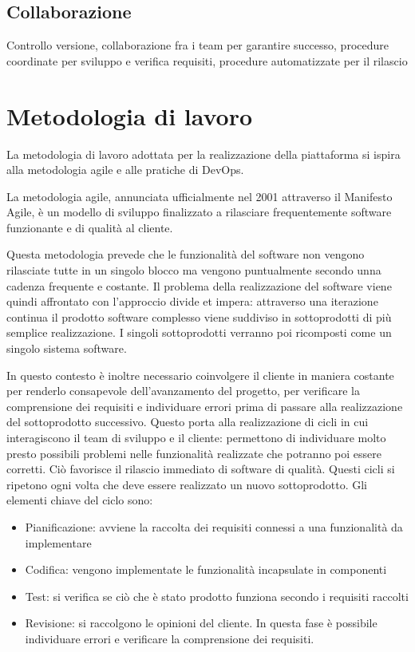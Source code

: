 \subsection{Collaborazione}
Controllo versione, collaborazione fra i team per garantire successo, procedure coordinate per sviluppo e verifica requisiti, procedure automatizzate per il rilascio


\section{Metodologia di lavoro}
La metodologia di lavoro adottata per la realizzazione della piattaforma si ispira alla metodologia agile e alle pratiche di DevOps.

La metodologia agile, annunciata ufficialmente nel 2001 attraverso il Manifesto Agile,
è un modello di sviluppo finalizzato a rilasciare frequentemente software funzionante e di qualità al cliente.

Questa metodologia prevede che le funzionalità del software non vengono rilasciate
tutte in un singolo blocco ma vengono puntualmente secondo unna cadenza frequente e costante.
Il problema della realizzazione del software viene quindi affrontato con l'approccio divide et impera:
attraverso una iterazione continua il prodotto software complesso viene suddiviso in sottoprodotti di più semplice realizzazione.
I singoli sottoprodotti verranno poi ricomposti come un singolo sistema software.

In questo contesto è inoltre necessario coinvolgere il cliente in maniera costante per renderlo consapevole dell'avanzamento del progetto,
per verificare la comprensione dei requisiti e individuare errori prima di passare alla realizzazione del sottoprodotto successivo.
Questo porta alla realizzazione di cicli in cui interagiscono il team di sviluppo e il cliente: permettono
di individuare molto presto possibili problemi nelle funzionalità realizzate che potranno poi essere corretti. Ciò favorisce il rilascio immediato di software di qualità.
Questi cicli si ripetono ogni volta che deve essere realizzato un nuovo sottoprodotto. Gli elementi chiave del ciclo sono:
\begin{itemize}
    \itemsep0em
    \item Pianificazione: avviene la raccolta dei requisiti connessi a una funzionalità da implementare
    \item Codifica: vengono implementate le funzionalità incapsulate in componenti
    \item Test: si verifica se ciò che è stato prodotto funziona secondo i requisiti raccolti
    \item Revisione: si raccolgono le opinioni del cliente. In questa fase è possibile individuare errori e verificare la comprensione dei requisiti.
\end{itemize}

